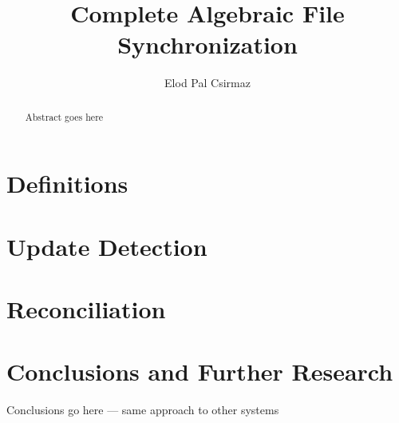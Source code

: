 \documentclass[12pt]{article}
\title{Complete Algebraic File Synchronization}
\author{Elod Pal Csirmaz}
\begin{document}
\maketitle
\begin{abstract}
Abstract goes here
\end{abstract}







\section{Definitions}\label{sec_def}











\section{Update Detection}\label{sec_update}









\section{Reconciliation}\label{sec_rec}



















\section{Conclusions and Further Research}

Conclusions go here --- same approach to other systems
\medskip

\end{document}
